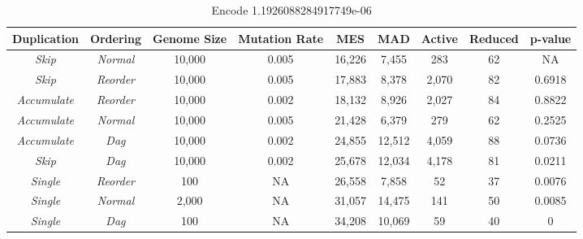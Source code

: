 \documentclass[journal]{IEEEtran}
\begin{document}
\begin{table*}
	\centering
	\begin{tabular}{|c|c|c|c|c|c|c|c|c|}
	  \hline
\textbf{Duplication} & \textbf{Ordering} & \textbf{Genome Size} & \textbf{Mutation Rate} & \textbf{MES} & \textbf{MAD} & \textbf{Active} & \textbf{Reduced} & \textbf{p-value} \\ \hline
\rowcolor{Gray}
\emph{Skip} & \emph{Normal}        & 10,000 & 0.005 & 16,226 & 7,455  &   283 & 62 & NA \\ \hline
\emph{Skip} & \emph{Reorder}       & 10,000 & 0.005 & 17,883 & 8,378  & 2,070 & 82 & 0.6918 \\ \hline
\emph{Accumulate} & \emph{Reorder} & 10,000 & 0.002 & 18,132 & 8,926  & 2,027 & 84 & 0.8822 \\ \hline
\emph{Accumulate} & \emph{Normal}  & 10,000 & 0.005 & 21,428 & 6,379  &   279 & 62 & 0.2525 \\ \hline
\emph{Accumulate} & \emph{Dag}     & 10,000 & 0.002 & 24,855 & 12,512 & 4,059 & 88 & 0.0736 \\ \hline
\emph{Skip} & \emph{Dag}           & 10,000 & 0.002 & 25,678 & 12,034 & 4,178 & 81 & 0.0211 \\ \hline
\emph{Single} & \emph{Reorder}     & 100    & NA    & 26,558 & 7,858  &    52 & 37 & 0.0076 \\ \hline
\emph{Single} & \emph{Normal}      & 2,000  & NA    & 31,057 & 14,475 &   141 & 50 & 0.0085 \\ \hline
\emph{Single} & \emph{Dag}         & 100    & NA    & 34,208 & 10,069 &    59 & 40 & 0 \\ \hline
	\end{tabular}
	\caption{Encode 1.1926088284917749e-06}
	\label{tab:encode}
\end{table*}
\end{document}
